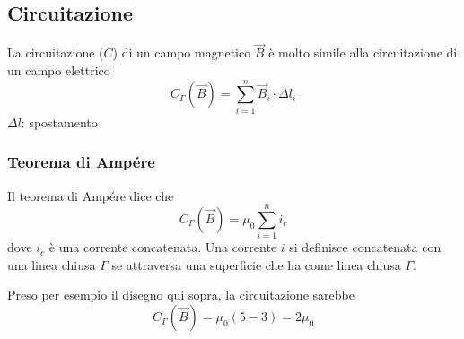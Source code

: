 \subsection{Circuitazione}
La circuitazione ($C$) di un campo magnetico $\vec{B}$ è molto simile alla circuitazione
di un campo elettrico
\begin{equation*}
  C_\Gamma(\vec{B}) = \sum^{n}_{i=1}\vec{B}_i\cdot\Delta l_i
\end{equation*}
$\Delta l$: spostamento

\subsubsection{Teorema di Ampére}
Il teorema di Ampére dice che
\begin{equation*}
  C_\Gamma(\vec{B}) = \mu_0 \sum\limits^{n}_{i=1} i_c
\end{equation*}
dove $i_c$ è una corrente concatenata. Una corrente $i$ si definisce concatenata con una linea
chiusa $\Gamma$ se attraversa una superficie che ha come linea chiusa $\Gamma$.

\begin{center}
\end{center}

Preso per esempio il disegno qui sopra, la circuitazione sarebbe
\begin{equation*}
  C_\Gamma(\vec{B}) = \mu_0(5-3) = 2\mu_0
\end{equation*}

